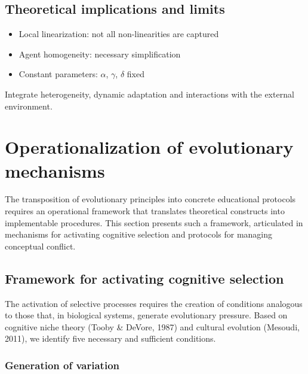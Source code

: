 \newpage

\subsection{Theoretical implications and limits}

\begin{itemize}
	\item Local linearization: not all non-linearities are captured
	\item Agent homogeneity: necessary simplification
	\item Constant parameters: $\alpha$, $\gamma$, $\delta$ fixed
\end{itemize}

\begin{tcolorbox}[title=Future Developments, colback=purple!5!white]
	Integrate heterogeneity, dynamic adaptation and interactions with the external environment.
\end{tcolorbox}





\section{Operationalization of evolutionary mechanisms}
\label{sec:operational-mechanisms}

The transposition of evolutionary principles into concrete educational protocols requires 
an operational framework that translates theoretical constructs into implementable procedures. 
This section presents such a framework, articulated in mechanisms for activating 
cognitive selection and protocols for managing conceptual conflict.

\subsection{Framework for activating cognitive selection}
\label{subsec:activation-framework}

The activation of selective processes requires the creation of conditions analogous 
to those that, in biological systems, generate evolutionary pressure. Based on 
cognitive niche theory (Tooby \& DeVore, 1987) and cultural evolution 
(Mesoudi, 2011), we identify five necessary and sufficient conditions.

\subsubsection{Generation of variation}

